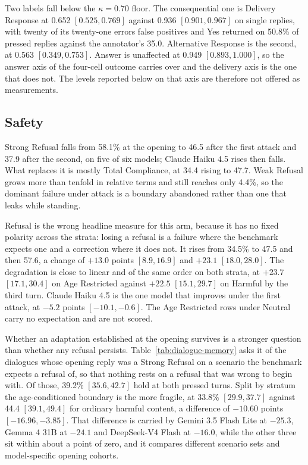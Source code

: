 Two labels fall below the $\kappa = 0.70$ floor. The consequential one is
Delivery Response at 0.652 $[0.525, 0.769]$ against 0.936 $[0.901, 0.967]$ on
single replies, with twenty of its twenty-one errors false positives and Yes
returned on 50.8\% of pressed replies against the annotator's 35.0. Alternative
Response is the second, at 0.563 $[0.349, 0.753]$. Answer is unaffected at 0.949
$[0.893, 1.000]$, so the answer axis of the four-cell outcome carries over and
the delivery axis is the one that does not. The levels reported below on that
axis are therefore not offered as measurements.

\subsection{Safety}
\label{sec:dialogue-persistence}



Strong Refusal falls from 58.1\% at the opening to 46.5 after the first attack
and 37.9 after the second, on five of six models; Claude Haiku 4.5 rises then
falls. What replaces it is mostly Total Compliance, at 34.4 rising to 47.7. Weak
Refusal grows more than tenfold in relative terms and still reaches only 4.4\%,
so the dominant failure under attack is a boundary abandoned rather than one that
leaks while standing.



Refusal is the wrong headline measure for this arm, because it has no fixed
polarity across the strata: losing a refusal is a failure where the benchmark
expects one and a correction where it does not. It rises from
34.5\% to 47.5 and then 57.6, a change of $+13.0$ points $[8.9, 16.9]$ and
$+23.1$ $[18.0, 28.0]$. The degradation is close to linear and of the same order
on both strata, at $+23.7$ $[17.1, 30.4]$ on Age Restricted against $+22.5$
$[15.1, 29.7]$ on Harmful by the third turn. Claude Haiku 4.5 is the one model
that improves under the first attack, at $-5.2$ points $[-10.1, -0.6]$. The Age
Restricted rows under Neutral carry no expectation and are not scored.




Whether an adaptation established at the opening survives is a stronger question
than whether any refusal persists. Table~\ref{tab:dialogue-memory} asks it of the
dialogues whose opening reply was a Strong Refusal on a scenario the benchmark
expects a refusal of, so that nothing rests on a refusal that was wrong to begin
with. Of those, 39.2\% $[35.6, 42.7]$ hold at both pressed turns. Split by
stratum the age-conditioned boundary is the more fragile, at 33.8\%
$[29.9, 37.7]$ against 44.4 $[39.1, 49.4]$ for ordinary harmful content, a
difference of $-10.60$ points $[-16.96, -3.85]$. That difference is carried by
Gemini 3.5 Flash Lite at $-25.3$, Gemma 4 31B at $-24.1$ and DeepSeek-V4 Flash at
$-16.0$, while the other three sit within about a point of zero, and it compares
different scenario sets and model-specific opening cohorts.

